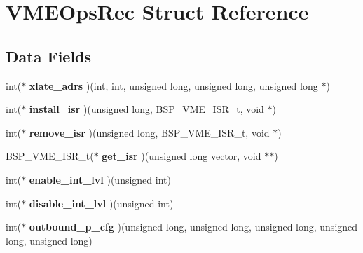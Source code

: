 \hypertarget{structVMEOpsRec}{}\section{V\+M\+E\+Ops\+Rec Struct Reference}
\label{structVMEOpsRec}
\subsection*{Data Fields}
\begin{DoxyCompactItemize}
\item 
\mbox{\label{structVMEOpsRec_a3ed6dc0001bc5f1f9f3931ee7f3512f5}} 
int($\ast$ {\bfseries xlate\+\_\+adrs} )(int, int, unsigned long, unsigned long, unsigned long $\ast$)
\item 
\mbox{\label{structVMEOpsRec_a33be0a603ac0f5836c28df72e2f51fe6}} 
int($\ast$ {\bfseries install\+\_\+isr} )(unsigned long, B\+S\+P\+\_\+\+V\+M\+E\+\_\+\+I\+S\+R\+\_\+t, void $\ast$)
\item 
\mbox{\label{structVMEOpsRec_a948c05aa55a999c212b5a5f5288ed1c8}} 
int($\ast$ {\bfseries remove\+\_\+isr} )(unsigned long, B\+S\+P\+\_\+\+V\+M\+E\+\_\+\+I\+S\+R\+\_\+t, void $\ast$)
\item 
\mbox{\label{structVMEOpsRec_aaf1584430bcdf766923e01d999e69bc8}} 
B\+S\+P\+\_\+\+V\+M\+E\+\_\+\+I\+S\+R\+\_\+t($\ast$ {\bfseries get\+\_\+isr} )(unsigned long vector, void $\ast$$\ast$)
\item 
\mbox{\label{structVMEOpsRec_a169ce6c9c8f66fc9df2bcfd74258d3d7}} 
int($\ast$ {\bfseries enable\+\_\+int\+\_\+lvl} )(unsigned int)
\item 
\mbox{\label{structVMEOpsRec_a3bed3eab93c940e710f4072af91e57d2}} 
int($\ast$ {\bfseries disable\+\_\+int\+\_\+lvl} )(unsigned int)
\item 
\mbox{\label{structVMEOpsRec_af29d71a969be304199634a4b3a60a85d}} 
int($\ast$ {\bfseries outbound\+\_\+p\+\_\+cfg} )(unsigned long, unsigned long, unsigned long, unsigned long, unsigned long)
\item 
\mbox{\label{structVMEOpsRec_af9c03288dde4be1ff7f7f71f17cb08f1}} 
$$
\end{DoxyCompactItemize}

